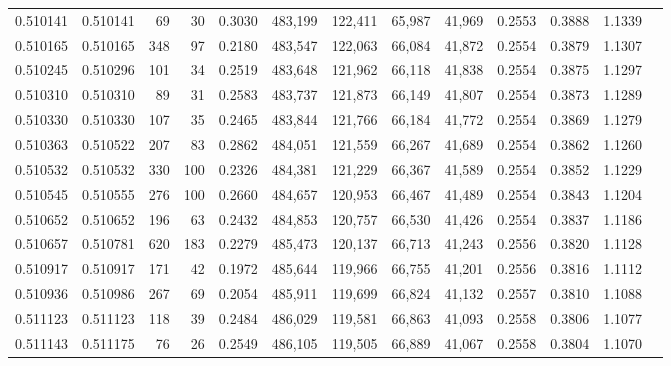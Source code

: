 \begin{tabular}{rrrrrrrrrrrrr}
0.510141 & 0.510141 &    69 &    30 &                                     0.3030 & 483,199 & 122,411 &  65,987 &  41,969 & 0.2553 & 0.3888 & 1.1339 \\
0.510165 & 0.510165 &   348 &    97 &                                     0.2180 & 483,547 & 122,063 &  66,084 &  41,872 & 0.2554 & 0.3879 & 1.1307 \\
0.510245 & 0.510296 &   101 &    34 &                                     0.2519 & 483,648 & 121,962 &  66,118 &  41,838 & 0.2554 & 0.3875 & 1.1297 \\
0.510310 & 0.510310 &    89 &    31 &                                     0.2583 & 483,737 & 121,873 &  66,149 &  41,807 & 0.2554 & 0.3873 & 1.1289 \\
0.510330 & 0.510330 &   107 &    35 &                                     0.2465 & 483,844 & 121,766 &  66,184 &  41,772 & 0.2554 & 0.3869 & 1.1279 \\
0.510363 & 0.510522 &   207 &    83 &                                     0.2862 & 484,051 & 121,559 &  66,267 &  41,689 & 0.2554 & 0.3862 & 1.1260 \\
0.510532 & 0.510532 &   330 &   100 &                                     0.2326 & 484,381 & 121,229 &  66,367 &  41,589 & 0.2554 & 0.3852 & 1.1229 \\
0.510545 & 0.510555 &   276 &   100 &                                     0.2660 & 484,657 & 120,953 &  66,467 &  41,489 & 0.2554 & 0.3843 & 1.1204 \\
0.510652 & 0.510652 &   196 &    63 &                                     0.2432 & 484,853 & 120,757 &  66,530 &  41,426 & 0.2554 & 0.3837 & 1.1186 \\
0.510657 & 0.510781 &   620 &   183 &                                     0.2279 & 485,473 & 120,137 &  66,713 &  41,243 & 0.2556 & 0.3820 & 1.1128 \\
0.510917 & 0.510917 &   171 &    42 &                                     0.1972 & 485,644 & 119,966 &  66,755 &  41,201 & 0.2556 & 0.3816 & 1.1112 \\
0.510936 & 0.510986 &   267 &    69 &                                     0.2054 & 485,911 & 119,699 &  66,824 &  41,132 & 0.2557 & 0.3810 & 1.1088 \\
0.511123 & 0.511123 &   118 &    39 &                                     0.2484 & 486,029 & 119,581 &  66,863 &  41,093 & 0.2558 & 0.3806 & 1.1077 \\
0.511143 & 0.511175 &    76 &    26 &                                     0.2549 & 486,105 & 119,505 &  66,889 &  41,067 & 0.2558 & 0.3804 & 1.1070 \\

\end{tabular}
